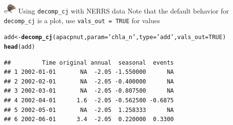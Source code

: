 \documentclass[xcolor=dvipsnames,serif]{beamer}\usepackage[]{graphicx}\usepackage[]{color}
\makeatletter
\newcommand{\hlnum}[1]{\textcolor[rgb]{0.686,0.059,0.569}{#1}}%
\newcommand{\hlstr}[1]{\textcolor[rgb]{0.192,0.494,0.8}{#1}}%
\newcommand{\hlstd}[1]{\textcolor[rgb]{0.345,0.345,0.345}{#1}}%
\newcommand{\hlkwb}[1]{\textcolor[rgb]{0.69,0.353,0.396}{#1}}%
\newcommand{\hlkwc}[1]{\textcolor[rgb]{0.333,0.667,0.333}{#1}}%
\newcommand{\hlkwd}[1]{\textcolor[rgb]{0.737,0.353,0.396}{\textbf{#1}}}%
\newenvironment{kframe}{%
 \def\at@end@of@kframe{}%
 \ifinner\ifhmode%
  \def\at@end@of@kframe{\end{minipage}}%
  \begin{minipage}{\columnwidth}%
 \fi\fi%
 \def\FrameCommand##1{\hskip\@totalleftmargin \hskip-\fboxsep
 \colorbox{shadecolor}{##1}\hskip-\fboxsep
     \hskip-\linewidth \hskip-\@totalleftmargin \hskip\columnwidth}%
 \MakeFramed {\advance\hsize-\width
   \@totalleftmargin\z@ \linewidth\hsize
   \@setminipage}}%
 {\par\unskip\endMakeFramed%
 \at@end@of@kframe}
\newenvironment{knitrout}{}{} %
\makeatother
\begin{document}
\begin{frame}[fragile]{\includegraphics[width = 0.05\textwidth]{imgs/swmprat.png} Using \texttt{decomp\_cj} with NERRS data}
Note that the default behavior for \texttt{decomp\_cj} is a plot, use \texttt{vals\_out = TRUE} for values
\begin{knitrout}\scriptsize
{}\color{fgcolor}\begin{kframe}
\begin{alltt}
\hlstd{add} \hlkwb{<-} \hlkwd{decomp_cj}\hlstd{(apacpnut,} \hlkwc{param} \hlstd{=} \hlstr{'chla_n'}\hlstd{,} \hlkwc{type} \hlstd{=} \hlstr{'add'}\hlstd{,} \hlkwc{vals_out} \hlstd{=} \hlnum{TRUE}\hlstd{)}
\hlkwd{head}\hlstd{(add)}
\end{alltt}
\begin{verbatim}
##         Time original annual  seasonal  events
## 1 2002-01-01       NA  -2.05 -1.550000      NA
## 2 2002-02-01       NA  -2.05 -0.400000      NA
## 3 2002-03-01       NA  -2.05 -0.807500      NA
## 4 2002-04-01      1.6  -2.05 -0.562500 -0.6875
## 5 2002-05-01       NA  -2.05  1.258333      NA
## 6 2002-06-01      3.4  -2.05  0.220000  0.3300
\end{verbatim}
\end{kframe}
\end{knitrout}
\end{frame}
\end{document}
